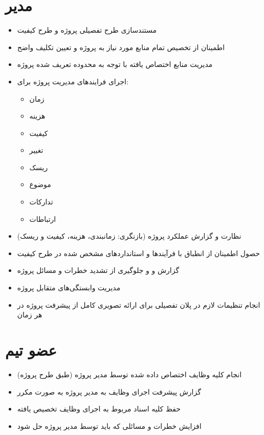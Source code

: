 \section{مدیر}
\begin{itemize}
\item مستندسازی طرح تفصیلی پروژه و طرح کیفیت
\item اطمینان از تخصیص تمام منابع مورد نیاز به پروژه و تعیین تکلیف واضح
\item مدیریت منابع اختصاص یافته با توجه به محدوده تعریف شده پروژه
\item 
اجرای فرایند‌های مدیریت پروژه برای:
\begin{itemize}
\item زمان
\item هزینه
\item کیفیت
\item تغییر
\item ریسک
\item موضوع
\item تدارکات
\item ارتباطات
\end{itemize}
\item نظارت و گزارش عملکرد پروژه (بازنگری: زمانبندی، هزینه، کیفیت و ریسک)
\item حصول اطمینان از انطباق با فرآیندها و استانداردهای مشخص شده در طرح کیفیت
\item گزارش و و جلوگیری از تشدید خطرات و مسائل پروژه
\item مدیریت وابستگی‌های متقابل پروژه
\item انجام تنظیمات لازم در پلان تفصیلی برای ارائه تصویری کامل از پیشرفت پروژه در هر زمان
\end{itemize}

\section{عضو تیم}
\begin{itemize}
\item انجام کلیه وظایف اختصاص داده شده توسط مدیر پروژه (طبق طرح پروژه)
\item گزارش پیشرفت اجرای وظایف به مدیر پروژه به صورت مکرر
\item حفظ کلیه اسناد مربوط به اجرای وظایف تخصیص یافته
\item افزایش خطرات و مسائلی که باید توسط مدیر پروژه حل شود
\end{itemize}